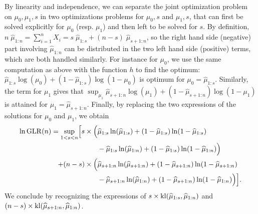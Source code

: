     By linearity and independence, we can separate the joint optimization problem on $\mu_0,\mu_1,s$ in two optimizations problems for $\mu_0,s$ and $\mu_1,s$, that can first be solved explicitly for $\mu_0$ (resp. $\mu_1$) and then left to be solved for $s$.
    By definition, $n \; \widehat{\mu}_{1:n} = \sum_{i=1}^n X_i = s \;\widehat{\mu}_{1:s} + (n-s) \;\widehat{\mu}_{s+1:n}$, so the right hand side (negative) part involving $\widehat{\mu}_{1:n}$ can be distributed in the two left hand side (positive) terms,
    which are both handled similarly.
    For instance for $\mu_0$, we use the same computation as above with the function $h$ to find the optimum:
    $\widehat{\mu}_{1:s} \log(\mu_0) + (1 - \widehat{\mu}_{1:s}) \log(1-\mu_0)$
    is optimum for $\mu_0 = \widehat{\mu}_{1:s}$.
    Similarly, the term for $\mu_1$ gives that $\sup_{\mu_1} \widehat{\mu}_{s+1:n} \log(\mu_1) + (1 - \widehat{\mu}_{s+1:n}) \log(1-\mu_1)$
    is attained for $\mu_1 = \widehat{\mu}_{s+1:n}$.
    Finally, by replacing the two expressions of the solutions for $\mu_0$ and $\mu_1$,
    we obtain
    \begin{align*}
        \ln \mathrm{GLR}(n)
        = \sup\limits_{1 < s < n} \Bigl[
            s \times \Bigl(
                    & \widehat{\mu}_{1:s} \ln(\widehat{\mu}_{1:s}) + (1 - \widehat{\mu}_{1:s}) \ln(1-\widehat{\mu}_{1:s}) \\
                    & - \widehat{\mu}_{1:s} \ln(\widehat{\mu}_{1:n}) + (1 - \widehat{\mu}_{1:s}) \ln(1-\widehat{\mu}_{1:n})
            \Bigr) \\
            + (n-s) \times \Bigl(
                & \widehat{\mu}_{s+1:n} \ln(\widehat{\mu}_{s+1:n}) + (1 - \widehat{\mu}_{s+1:n}) \ln(1-\widehat{\mu}_{s+1:n}) \\
                & - \widehat{\mu}_{s+1:n} \ln(\widehat{\mu}_{1:n}) + (1 - \widehat{\mu}_{s+1:n}) \ln(1-\widehat{\mu}_{1:n})
            \Bigr)
        \Bigr].
    \end{align*}
    We conclude by recognizing the expressions of $s \times \mathrm{kl}(\widehat{\mu}_{1:s}, \widehat{\mu}_{1:n})$
    and $(n-s) \times \mathrm{kl}(\widehat{\mu}_{s+1:n}, \widehat{\mu}_{1:n})$.




